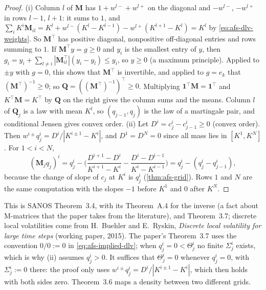 \begin{proof}
(i) Column $l$ of $\mathbf M$ has $1+w^{l-}+w^{l+}$ on the diagonal and $-w^{l-}$, $-w^{l+}$ in rows $l-1$, $l+1$: it sums to $1$,
and $\sum_iK^i\mathbf M_{il}=K^l+w^{l-}(K^l-K^{l-1})-w^{l+}(K^{l+1}-K^l)=K^l$ by \eqref{eq:afs-dlv-weights}. So $\mathbf M^\top$ has
positive diagonal, nonpositive off-diagonal entries and rows summing to $1$. If $\mathbf M^\top y=g\ge0$ and $y_i$ is the
smallest entry of $y$, then $g_i=y_i+\sum_{l\ne i}|\mathbf M^\top_{il}|(y_i-y_l)\le y_i$, so $y\ge0$ (a maximum principle). Applied to $\pm y$ with
$g=0$, this shows that $\mathbf M^\top$ is invertible, and applied to $g=e_k$ that $(\mathbf M^\top)^{-1}\ge0$; so $\mathbf Q=((\mathbf M^\top)^{-1})^\top\ge0$.
Multiplying $\mathbf 1^\top\mathbf M=\mathbf 1^\top$ and $K^\top\mathbf M=K^\top$ by $\mathbf Q$ on the right gives the column sums and the means. Column
$l$ of $\mathbf Q_j$ is a law with mean $K^l$, so $(q_{j-1},q_j)$ is the law of a martingale pair, and conditional Jensen gives
convex order. (ii) Let $D^i=c_j^i-c_{j-1}^i\ge0$ (convex order). Then $w^{i\pm}q_j^i=D^i/|K^{i\pm1}-K^i|$, and
$D^1=D^N=0$ since all mass lies in $[K^1,K^N]$. For $1<i<N$,
\[
  (\mathbf M_jq_j)^i=q_j^i-\Big(\frac{D^{i+1}-D^i}{K^{i+1}-K^i}-\frac{D^i-D^{i-1}}{K^i-K^{i-1}}\Big)=q_j^i-(q_j^i-q_{j-1}^i),
\]
because the change of slope of $c_j$ at $K^i$ is $q_j^i$ (\cref{thm:afs-grid}). Rows $1$ and $N$ are the same computation with the
slopes $-1$ before $K^1$ and $0$ after $K^N$.
\end{proof}

This is SANOS Theorem~3.4, with its Theorem~A.4 for the inverse (a fact about M-matrices that the paper takes from the
literature), and Theorem~3.7; discrete local volatilities come from H.~Buehler and E.~Ryskin, \emph{Discrete local
volatility for large time steps} (working paper, 2015). The paper's Theorem~3.7 uses the convention $0/0:=0$ in \eqref{eq:afs-implied-dlv}; when
$q_j^i=0<\Theta_j^i$ no finite $\Sigma_j^i$ exists, which is why (ii) assumes $q_j^i>0$. It suffices that $\Theta_j^i=0$ whenever
$q_j^i=0$, with $\Sigma_j^i:=0$ there: the proof only uses $w^{i\pm}q_j^i=D^i/|K^{i\pm1}-K^i|$, which then holds with both sides zero. Theorem~3.6 maps a density between two
different grids.

